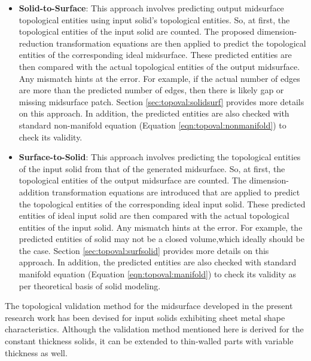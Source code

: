 \begin{itemize}
[noitemsep,topsep=2pt,parsep=2pt,partopsep=2pt]
\item \textbf{Solid-to-Surface}: This approach involves predicting output midsurface topological entities using input solid's topological entities.  So, at first, the topological entities of the input solid are counted. The proposed dimension-reduction transformation equations are then applied to predict the topological entities of the corresponding ideal midsurface. These predicted entities are then compared with the actual topological entities of the output midsurface. Any mismatch hints at the error. For example, if the actual number of edges are more than the predicted number of edges, then there is likely gap or missing midsurface patch. Section \ref{sec:topoval:solidsurf} provides more details on this approach. 
In addition, the predicted entities are also checked with standard non-manifold equation (Equation \ref{eqn:topoval:nonmanifold}) to check its validity.%
\item  \textbf{Surface-to-Solid}:  This approach involves predicting the topological entities of the input solid from that of the generated midsurface.  So, at first, the topological entities of the output midsurface are counted. The dimension-addition transformation equations are introduced that are applied to predict the topological entities of the corresponding ideal input solid. These predicted entities of ideal input solid are then compared with the actual topological entities of the input solid.  Any mismatch hints at the error. For example, the predicted entities of solid may not be a closed volume,which ideally should be the case. Section \ref{sec:topoval:surfsolid} provides more details on this approach. 
In addition, the predicted entities are also checked with standard manifold equation (Equation \ref{eqn:topoval:manifold}) to check its validity as per theoretical basis of solid modeling.
\end{itemize}

The topological validation method for the midsurface developed in the present research work has been devised for input solids exhibiting sheet metal shape characteristics.
Although the validation method mentioned here is derived for the constant thickness solids, it can be extended to thin-walled parts with variable thickness as well.

